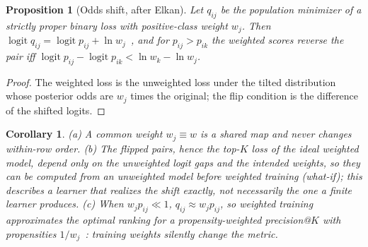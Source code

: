 \documentclass[sigconf,nonacm]{acmart}
\newtheorem{proposition}{Proposition}
\newtheorem{corollary}{Corollary}
\begin{document}
\begin{proposition}[Odds shift, after Elkan]
\label{prop:odds}
Let $q_{ij}$ be the population minimizer of a strictly proper binary loss with positive-class weight $w_j$. Then $\operatorname{logit}q_{ij}=\operatorname{logit}p_{ij}+\ln w_j$~\cite{Elkan2001,Saerens2002}, and for $p_{ij}>p_{ik}$ the weighted scores reverse the pair iff $\operatorname{logit}p_{ij}-\operatorname{logit}p_{ik}<\ln w_k-\ln w_j$.
\end{proposition}
\begin{proof}
The weighted loss is the unweighted loss under the tilted distribution whose posterior odds are $w_j$ times the original; the flip condition is the difference of the shifted logits.
\end{proof}
\begin{corollary}
\label{cor:odds}
(a) A common weight $w_j\equiv w$ is a shared map and never changes within-row order. (b) The flipped pairs, hence the top-$K$ loss of the \emph{ideal} weighted model, depend only on the unweighted logit gaps and the intended weights, so they can be computed from an unweighted model before weighted training (\emph{what-if}); this describes a learner that realizes the shift exactly, not necessarily the one a finite learner produces. (c) When $w_jp_{ij}\ll1$, $q_{ij}\approx w_jp_{ij}$, so weighted training approximates the optimal ranking for a propensity-weighted precision@$K$ with propensities $1/w_j$~\cite{Jain2016XMLLoss}: training weights silently change the metric.
\end{corollary}
\end{document}
